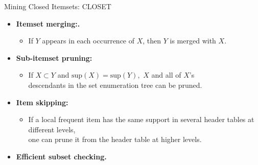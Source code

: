 \begin{frame}{Mining Closed Itemsets: CLOSET}
	\begin{itemize}
		\item \textbf{Itemset merging:.}
		\begin{itemize}
			\item If $Y$ appears in each occurrence of $X$, then $Y$ is merged 
			with $X$.
		\end{itemize}
		\item \textbf{Sub-itemset pruning:}
		\begin{itemize}
			\item If $X \subset Y$ and $\text{sup}(X) = \text{sup}(Y),$ $X$ and 
			all of $X$'s\\
			descendants in the set enumeration tree can be pruned.
		\end{itemize}
		\item \textbf{Item skipping:}
		\begin{itemize}
			\item If a local frequent item has the same support in several 
			header tables at different levels, \\
			one can prune it from the header table at higher levels.
		\end{itemize}
		\item \textbf{Efficient subset checking.}
	\end{itemize}
\end{frame}


